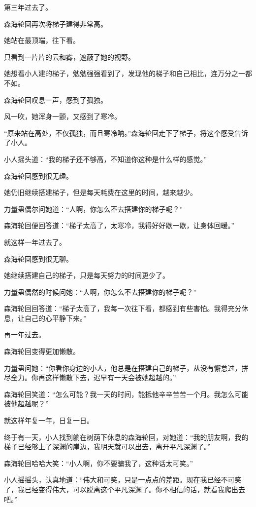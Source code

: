 \begin{this_body}
第三年过去了。

森海轮回再次将梯子建得非常高。

她站在最顶端，往下看。

只看到一片片的云和雾，遮蔽了她的视野。

她想看小人建的梯子，勉勉强强看到了，发现他的梯子和自己相比，连万分之一都不如。

森海轮回叹息一声，感到了孤独。

风一吹，她浑身一颤，又感到了寒冷。

“原来站在高处，不仅孤独，而且寒冷呐。”森海轮回走下了梯子，将这个感受告诉了小人。

小人摇头道：“我的梯子还不够高，不知道你这种是什么样的感觉。”

森海轮回感到很无趣。

她仍旧继续搭建梯子，但是每天耗费在这里的时间，越来越少。

力量蛊偶尔问她道：“人啊，你怎么不去搭建你的梯子呢？”

森海轮回便回答道：“梯子太高了，太寒冷，我得好好歇一歇，让身体回暖。”

就这样一年过去了。

森海轮回感到很无聊。

她继续搭建自己的梯子，只是每天努力的时间更少了。

力量蛊偶然的时候问她：“人啊，你怎么不去搭建你的梯子呢？”

森海轮回回答道：“梯子太高了，我每一次往下看，都感到有些害怕。我得充分休息，让自己的心平静下来。”

再一年过去。

森海轮回变得更加懒散。

力量蛊问她：“你看你身边的小人，他总是在搭建自己的梯子，从没有懈怠过，拼尽全力。你再这样懒散下去，迟早有一天会被她超越的。”

森海轮回笑道：“怎么可能？我一天的时间，能抵他辛辛苦苦一个月。我怎么可能被他超越呢？”

就这样年复一年，日复一日。

终于有一天，小人找到躺在树荫下休息的森海轮回，对她道：“我的朋友啊，我的梯子已经够上了深渊的崖边，我明天就可以出去，离开平凡深渊了。”

森海轮回哈哈大笑：“小人啊，你不要骗我了，这种话太可笑。”

小人摇摇头，认真地道：“伟大和可笑，只是一点点的差距。现在我已经不可笑了，我已经变得伟大，可以脱离这个平凡深渊了。你不相信的话，就看我爬出去吧。”


\end{this_body}
